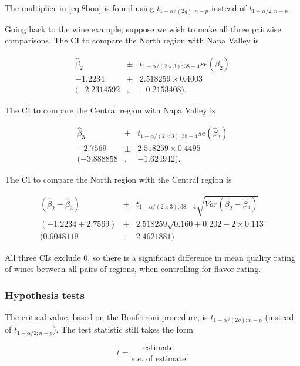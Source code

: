 \documentclass[
]{book}
\begin{document}
The multiplier in \eqref{eq:8bon} is found using \(t_{1-\alpha/(2g); n-p}\) instead of \(t_{1-\alpha/2; n-p}\).

Going back to the wine example, suppose we wish to make all three pairwise comparisons. The CI to compare the North region with Napa Valley is

\begin{eqnarray*}
\hat{\beta}_2 &\pm& t_{1-\alpha/(2\times3); 38-4} se(\hat{\beta}_2) \nonumber \\
-1.2234 &\pm& 2.518259 \times 0.4003 \nonumber \\
(-2.2314592 &,& -0.2153408). \nonumber
\end{eqnarray*}

The CI to compare the Central region with Napa Valley is

\begin{eqnarray*}
\hat{\beta}_3 &\pm& t_{1-\alpha/(2\times3); 38-4} se(\hat{\beta}_3) \nonumber \\
-2.7569 &\pm& 2.518259 \times 0.4495 \nonumber \\
(-3.888858 &,& -1.624942). \nonumber
\end{eqnarray*}

The CI to compare the North region with the Central region is

\begin{eqnarray*}
(\hat{\beta}_2-\hat{\beta}_3) &\pm&
t_{1-\alpha/(2\times3); 38-4}\sqrt{Var\left(\hat{\beta}_2-\hat{\beta}_3\right)} \nonumber \\
(-1.2234 + 2.7569) &\pm& 2.518259 \sqrt{0.160 + 0.202 - 2 \times 0.113} \nonumber \\
(0.6048119&,& 2.4621881) \nonumber
\end{eqnarray*}

All three CIs exclude 0, so there is a significant difference in mean quality rating of wines between all pairs of regions, when controlling for flavor rating.

\hypertarget{hypothesis-tests}{%
\subsubsection{Hypothesis tests}\label{hypothesis-tests}}

The critical value, based on the Bonferroni procedure, is \(t_{1-\alpha/(2g); n-p}\) (instead of \(t_{1-\alpha/2; n-p}\)). The test statistic still takes the form

\[
t = \frac{\text{estimate}}{s.e. \text{ of estimate}}.
\]
\end{document}
